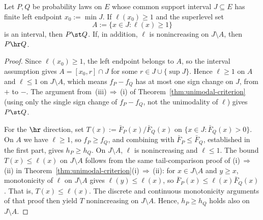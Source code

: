 \documentclass[11pt]{article}
\begin{document}
\begin{prop}
\label{prop:ylp-one-sided-score}
Let $P,Q$ be probability laws on $E$ whose common support interval $J\subseteq E$ has finite left endpoint $x_0:=\min J$. If $\ell(x_0)\ge 1$ and the superlevel set
\[
A:=\{x\in J:\ell(x)\ge 1\}
\]
is an interval, then $P\st Q$. If, in addition, $\ell$ is nonincreasing on $J\setminus A$, then $P\hr Q$.
\end{prop}

\begin{proof}
Since $\ell(x_0)\ge 1$, the left endpoint belongs to $A$, so the interval assumption gives $A=[x_0,r]\cap J$ for some $r\in J\cup\{\sup J\}$. Hence $\ell\ge 1$ on $A$ and $\ell\le 1$ on $J\setminus A$, which means $f_P-f_Q$ has at most one sign change on $J$, from $+$ to $-$. The argument from~\textup{(iii)}\,$\Rightarrow$\,\textup{(i)} of Theorem~\ref{thm:unimodal-criterion} (using only the single sign change of $f_P-f_Q$, not the unimodality of $\ell$) gives $P\st Q$.

For the $\hr$ direction, set $T(x):=\bar F_P(x)/\bar F_Q(x)$ on $\{x\in J:\bar F_Q(x)>0\}$. On $A$ we have $\ell\ge 1$, so $f_P\ge f_Q$, and combining with $\bar F_P\le \bar F_Q$, established in the first part, gives $h_P\ge h_Q$. On $J\setminus A$, $\ell$ is nonincreasing and $\ell\le 1$. The bound $T(x)\le \ell(x)$ on $J\setminus A$ follows from the same tail-comparison proof of \textup{(i)}\,$\Rightarrow$\,\textup{(ii)} in Theorem~\ref{thm:unimodal-criterion}\textup{(i)}\,$\Rightarrow$\,\textup{(ii)}: for $x\in J\setminus A$ and $y\ge x$, monotonicity of $\ell$ on $J\setminus A$ gives $\ell(y)\le\ell(x)$, so $\bar F_P(x)\le \ell(x)\bar F_Q(x)$. That is, $T(x)\le \ell(x)$. The discrete and continuous monotonicity arguments of that proof then yield $T$ nonincreasing on $J\setminus A$. Hence, $h_P\ge h_Q$ holds also on $J\setminus A$.
\end{proof}
\end{document}

